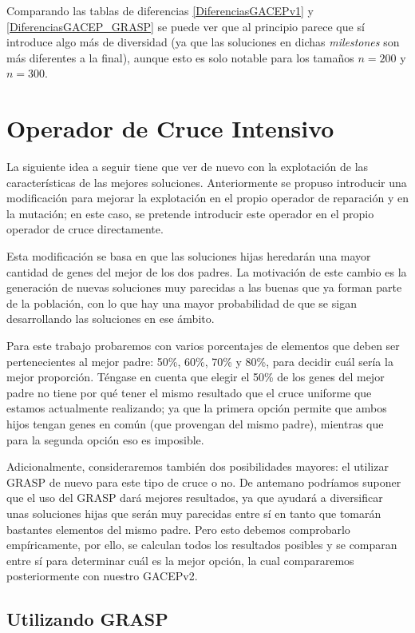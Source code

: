 Comparando las tablas de diferencias \ref{DiferenciasGACEPv1} y \ref{DiferenciasGACEP_GRASP} se puede ver que al principio parece que sí introduce algo más de diversidad (ya que las soluciones en dichas \textit{milestones} son más diferentes a la final), aunque esto es solo notable para los tamaños $n=200$ y $n=300$. 

\section{Operador de Cruce Intensivo}

La siguiente idea a seguir tiene que ver de nuevo con la explotación de las características de las mejores soluciones. 
Anteriormente se propuso introducir una modificación para mejorar la explotación en el propio operador de reparación y en la mutación; en este caso, se pretende introducir este operador en el propio operador de cruce directamente. 

Esta modificación se basa en que las soluciones hijas heredarán una mayor cantidad de genes del mejor de los dos padres. 
La motivación de este cambio es la generación de nuevas soluciones muy parecidas a las buenas que ya forman parte de la población, con lo que hay una mayor probabilidad de que se sigan desarrollando las soluciones en ese ámbito. 

Para este trabajo probaremos con varios porcentajes de elementos que deben ser pertenecientes al mejor padre: 50\%, 60\%, 70\% y 80\%, para decidir cuál sería la mejor proporción. 
Téngase en cuenta que elegir el 50\% de los genes del mejor padre no tiene por qué tener el mismo resultado que el cruce uniforme que estamos actualmente realizando; ya que la primera opción permite que ambos hijos tengan genes en común (que provengan del mismo padre), mientras que para la segunda opción eso es imposible. 

Adicionalmente, consideraremos también dos posibilidades mayores: el utilizar GRASP de nuevo para este tipo de cruce o no. 
De antemano podríamos suponer que el uso del GRASP dará mejores resultados, ya que ayudará a diversificar unas soluciones hijas que serán muy parecidas entre sí en tanto que tomarán bastantes elementos del mismo padre. 
Pero esto debemos comprobarlo empíricamente, por ello, se calculan todos los resultados posibles y se comparan entre sí para determinar cuál es la mejor opción, la cual compararemos posteriormente con nuestro GACEPv2. 

\subsection{Utilizando GRASP}

